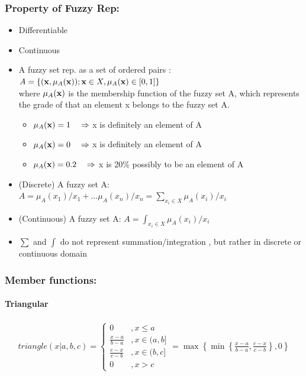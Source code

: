 \documentclass{tron}
\begin{document}
\subsubsection{Property of Fuzzy Rep:}
\begin{itemize}
	\item Differentiable
	\item Continuous
	\item A fuzzy set rep. as a set of ordered pairs : \\
		$A = \{ (\mathbf{x}, \mu_A(\mathbf{x})); \mathbf{x} \in X, \mu_A(\mathbf{x}) \in [0,1]\}$ \\
		where $\mu_A(\mathbf{x})$ is the membership function of the fuzzy set A, which represents the grade of  that an element x belongs to the fuzzy set A.
		\begin{itemize}
		\item $\mu_A(\mathbf{x}) = 1 \quad \Rightarrow$ x is definitely an element of A
		\item $\mu_A(\mathbf{x}) = 0 \quad \Rightarrow$ x is definitely  an element of A
		\item $\mu_A(\mathbf{x}) = 0.2 \quad \Rightarrow$ x is 20\% possibly to be an element of A
		\end{itemize}

	\item (Discrete) A fuzzy set A: $A = \mu_A(x_1)/x_1 + \dots \mu_A(x_n)/x_n = \sum_{x_i \in X} \mu_A(x_i)/x_i$
	\item (Continuous) A fuzzy set A: $A = \int_{x_i \in X} \mu_A(x_i)/x_i$
	\item $\sum$ and $\int$ do not represent summation/integration , but rather  in discrete or continuous domain
\end{itemize}

\subsubsection{Member functions:}
\paragraph{Triangular} 
 	\begin{align}
		triangle(x| a, b, c)	 = 
		\begin{cases}
			0 &, x \leq a \\
			\frac{x-a}{b-a} &, x \in (a, b] \\
			\frac{c-x}{c-b} &, x \in (b, c] \\
			0 &, x > c
		\end{cases}
		= \max \left\{ \min \left\{  \frac{x-a}{b-a}, \frac{c-x}{c-b} \right\}, 0 \right\}
	\end{align}
\end{document}

